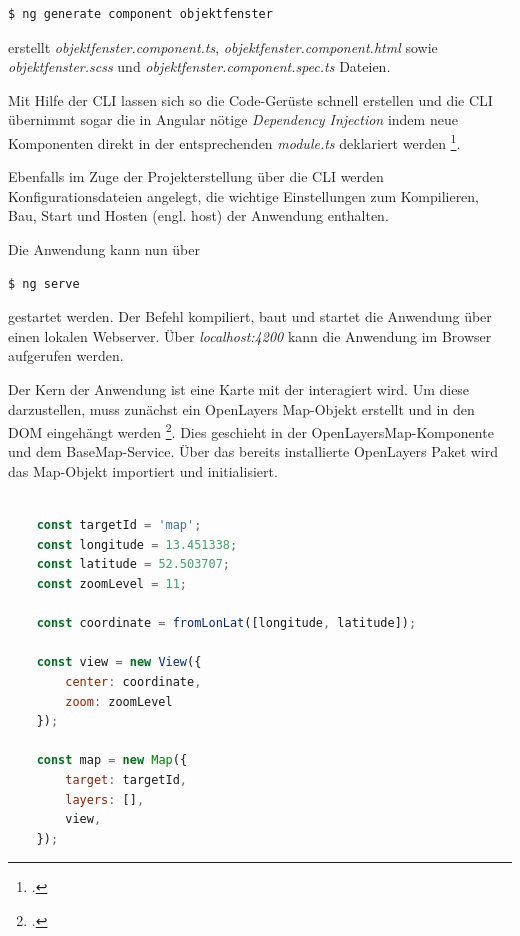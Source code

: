 \begin{lstlisting}[language=bash, caption={Erstellen der Objektfensterkomponente}]
$ ng generate component objektfenster
\end{lstlisting}

erstellt \emph{objektfenster.component.ts}, \emph{objektfenster.component.html} sowie \emph{objektfenster.scss} und \emph{objektfenster.component.spec.ts} Dateien.

Mit Hilfe der CLI lassen sich so die Code-Gerüste schnell erstellen und die CLI übernimmt sogar die in Angular nötige \emph{Dependency Injection} indem neue Komponenten direkt in der entsprechenden \emph{module.ts} deklariert werden \footcite{angular_cli}.

Ebenfalls im Zuge der Projekterstellung über die CLI werden Konfigurationsdateien angelegt, die wichtige Einstellungen zum Kompilieren, Bau, Start und Hosten (engl. host) der Anwendung enthalten.

Die Anwendung kann nun über 

\begin{lstlisting}[language=bash, caption={Starten der Anwendung}]
	$ ng serve
\end{lstlisting}

gestartet werden.
Der Befehl kompiliert, baut und startet die Anwendung über einen lokalen Webserver.
Über \emph{localhost:4200} kann die Anwendung im Browser aufgerufen werden.

Der Kern der Anwendung ist eine Karte mit der interagiert wird.
Um diese darzustellen, muss zunächst ein OpenLayers Map-Objekt erstellt und in den DOM eingehängt werden \footcite{openlayers_map}.
Dies geschieht in der OpenLayersMap-Komponente und dem BaseMap-Service.
Über das bereits installierte OpenLayers Paket wird das Map-Objekt importiert und initialisiert.

\begin{lstlisting}[language=JavaScript, caption={Erstellung der Karte}]

	const targetId = 'map';
	const longitude = 13.451338;
	const latitude = 52.503707;
	const zoomLevel = 11;
	
	const coordinate = fromLonLat([longitude, latitude]);
	
	const view = new View({
		center: coordinate,
		zoom: zoomLevel
	});
	
	const map = new Map({
		target: targetId,
		layers: [],
		view,
	});


\end{lstlisting}

